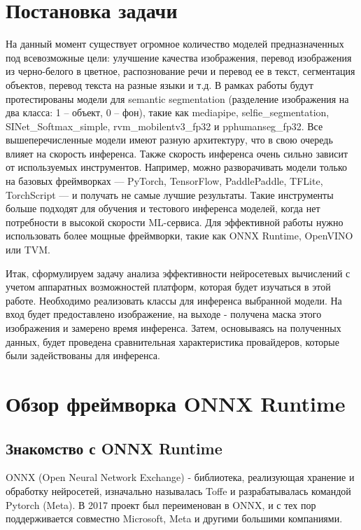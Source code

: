 \documentclass[a4paper,14pt]{extreport}
\begin{document}
    \chapter{Постановка задачи}
    На данный момент существует огромное количество моделей предназначенных под всевозможные цели: улучшение качества изображения, перевод изображения из черно-белого в цветное, распознование речи и перевод ее в текст, сегментация объектов, перевод текста на разные языки и т.д. В рамках работы будут протестированы модели для semantic segmentation (разделение изображения на два класса: 1 -- объект, 0 -- фон), такие как mediapipe, selfie\_segmentation, SINet\_Softmax\_simple, rvm\_mobilentv3\_fp32 и pphumanseg\_fp32. Все вышеперечисленные модели имеют разную архитектуру, что в свою очередь влияет на скорость инференса. Также скорость инференса очень сильно зависит от используемых инструментов. Например, можно разворачивать модели только на базовых фреймворках — PyTorch, TensorFlow, PaddlePaddle, TFLite, TorchScript — и получать не самые лучшие результаты. Такие инструменты больше подходят для обучения и тестового инференса моделей, когда нет потребности в высокой скорости ML-сервиса. Для эффективной работы нужно использовать более мощные фреймворки, такие как ONNX Runtime, OpenVINO или TVM.
    
    Итак, сформулируем задачу анализа эффективности нейросетевых вычислений с учетом аппаратных возможностей платформ, которая будет изучаться в этой работе. Необходимо реализовать классы для инференса выбранной модели. На вход будет предоставлено изображение, на выходе - получена маска этого изображения и замерено время инференса. Затем, основываясь на полученных данных, будет проведена сравнительная характеристика провайдеров, которые были задействованы для инференса.

    \chapter{Обзор фреймворка ONNX Runtime}
        \section{Знакомство с ONNX Runtime}
        ONNX (Open Neural Network Exchange) - библиотека, реализующая хранение и обработку нейросетей, изначально называлась Toffe и разрабатывалась командой Pytorch (Meta). В 2017 проект был переименован в ONNX, и с тех пор поддерживается совместно Microsoft, Meta и другими большими компаниями.
        
\end{document}

